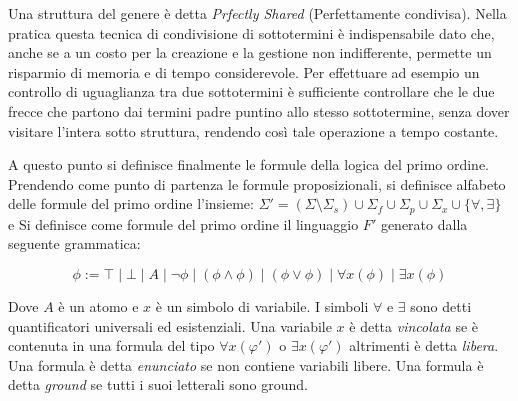 \documentclass[./main.tex]{subfiles}
\begin{document}
\begin{center}
\end{center}

Una struttura del genere è detta \textit{Prfectly Shared} (Perfettamente condivisa). Nella pratica questa
tecnica di condivisione di sottotermini è indispensabile dato che,
anche se a un costo per la creazione e la gestione non indifferente,
permette un risparmio di memoria e di tempo considerevole. Per effettuare ad esempio un controllo 
di uguaglianza tra due sottotermini è sufficiente controllare che le due frecce che partono dai termini padre
puntino allo stesso sottotermine, senza dover visitare l'intera sotto struttura, rendendo così tale operazione a tempo costante.


A questo punto si definisce finalmente le formule della logica del primo ordine. Prendendo come punto di partenza le formule proposizionali,
si definisce alfabeto delle formule del primo ordine l'insieme: 
$\Sigma' = (\Sigma \setminus \Sigma_s) \cup \Sigma_f \cup \Sigma_p \cup \Sigma_x \cup \{\forall, \exists\}$ 
e Si definisce come formule del primo ordine il linguaggio $F'$ generato dalla seguente grammatica:

$$ \phi := \top \mid \bot \mid A \mid \lnot \phi \mid (\phi \land \phi) \mid (\phi \lor \phi) \mid \forall x (\phi) \mid \exists x (\phi) $$

Dove $A$ è un atomo e $x$ è un simbolo di variabile. I simboli $\forall$ e $\exists$ sono detti quantificatori universali ed esistenziali.
Una variabile $x$ è detta \textit{vincolata} se è contenuta in una formula del tipo $\forall x (\varphi')$ o $\exists x (\varphi')$ 
altrimenti è detta \textit{libera}. Una formula è detta \textit{enunciato} se non contiene variabili libere. Una formula è detta 
\textit{ground} se tutti i suoi letterali sono ground.
\end{document}
